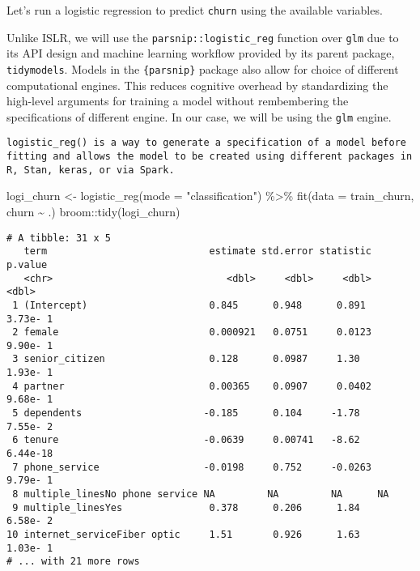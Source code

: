 \documentclass[
]{article}
\newenvironment{Shaded}{\begin{snugshade}}{\end{snugshade}}
\newcommand{\AttributeTok}[1]{\textcolor[rgb]{0.77,0.63,0.00}{#1}}
\newcommand{\FunctionTok}[1]{\textcolor[rgb]{0.00,0.00,0.00}{#1}}
\newcommand{\NormalTok}[1]{#1}
\newcommand{\OtherTok}[1]{\textcolor[rgb]{0.56,0.35,0.01}{#1}}
\newcommand{\SpecialCharTok}[1]{\textcolor[rgb]{0.00,0.00,0.00}{#1}}
\newcommand{\StringTok}[1]{\textcolor[rgb]{0.31,0.60,0.02}{#1}}
\begin{document}
Let's run a logistic regression to predict \texttt{churn} using the
available variables.

Unlike ISLR, we will use the \texttt{parsnip::logistic\_reg} function
over \texttt{glm} due to its API design and machine learning workflow
provided by its parent package, \texttt{tidymodels}. Models in the
\texttt{\{parsnip\}} package also allow for choice of different
computational engines. This reduces cognitive overhead by standardizing
the high-level arguments for training a model without rembembering the
specifications of different engine. In our case, we will be using the
\texttt{glm} engine.

\begin{verbatim}
logistic_reg() is a way to generate a specification of a model before fitting and allows the model to be created using different packages in R, Stan, keras, or via Spark.
\end{verbatim}

\begin{Shaded}
\begin{Highlighting}[]
\NormalTok{logi\_churn }\OtherTok{\textless{}{-}} \FunctionTok{logistic\_reg}\NormalTok{(}\AttributeTok{mode =} \StringTok{"classification"}\NormalTok{) }\SpecialCharTok{\%\textgreater{}\%}
  \FunctionTok{fit}\NormalTok{(}\AttributeTok{data =}\NormalTok{ train\_churn, churn }\SpecialCharTok{\textasciitilde{}}\NormalTok{ .)}
\NormalTok{broom}\SpecialCharTok{::}\FunctionTok{tidy}\NormalTok{(logi\_churn) }
\end{Highlighting}
\end{Shaded}

\begin{verbatim}
# A tibble: 31 x 5
   term                            estimate std.error statistic   p.value
   <chr>                              <dbl>     <dbl>     <dbl>     <dbl>
 1 (Intercept)                     0.845      0.948      0.891   3.73e- 1
 2 female                          0.000921   0.0751     0.0123  9.90e- 1
 3 senior_citizen                  0.128      0.0987     1.30    1.93e- 1
 4 partner                         0.00365    0.0907     0.0402  9.68e- 1
 5 dependents                     -0.185      0.104     -1.78    7.55e- 2
 6 tenure                         -0.0639     0.00741   -8.62    6.44e-18
 7 phone_service                  -0.0198     0.752     -0.0263  9.79e- 1
 8 multiple_linesNo phone service NA         NA         NA      NA       
 9 multiple_linesYes               0.378      0.206      1.84    6.58e- 2
10 internet_serviceFiber optic     1.51       0.926      1.63    1.03e- 1
# ... with 21 more rows
\end{verbatim}
\end{document}
